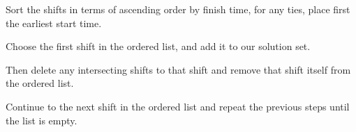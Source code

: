 \begin{soln}
	Sort the shifts in terms of ascending order by finish time, for any ties, place first the earliest start time.

	Choose the first shift in the ordered list, and add it to our solution set.

	Then delete any intersecting shifts to that shift and remove that shift itself from the ordered list.

	Continue to the next shift in the ordered list and repeat the previous steps until the list is empty.
\end{soln}

